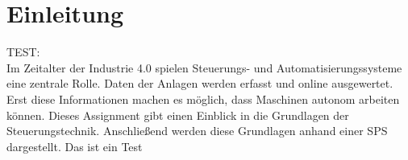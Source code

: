 \section{Einleitung}
TEST:\\
Im Zeitalter der Industrie 4.0 spielen Steuerungs- und Automatisierungssysteme eine zentrale Rolle. Daten der Anlagen werden erfasst und online ausgewertet. Erst diese Informationen machen es möglich, dass Maschinen autonom arbeiten können.\autocite[vgl.][24]{Seitz2021} Dieses Assignment gibt einen Einblick in die Grundlagen der Steuerungstechnik. Anschließend werden diese Grundlagen anhand einer \ac{SPS} dargestellt.
Das ist ein Test\autocite{oV2021a}
